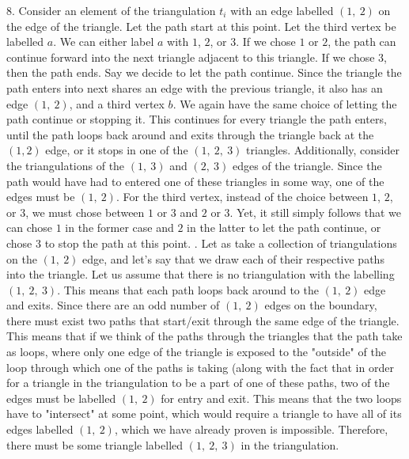 \documentclass{article}
\begin{document}
8. Consider an element of the triangulation $t_i$ with an edge labelled $(1, \ 2)$ on the edge of the triangle. Let the path start at this point. Let the third vertex be labelled $a$. We can either label $a$ with $1$, $2$, or $3$. If we chose $1$ or $2$, the path can continue forward into the next triangle adjacent to this triangle. If we chose $3$, then the path ends. Say we decide to let the path continue. Since the triangle the path enters into next shares an edge with the previous triangle, it also has an edge $(1, \ 2)$, and a third vertex $b$. We again have the same choice of letting the path continue or stopping it. This continues for every triangle the path enters, until the path loops back around and exits through the triangle back at the $(1, 2)$ edge, or it stops in one of the $(1, \ 2, \ 3)$ triangles. Additionally, consider the triangulations of the $(1, \ 3)$ and $(2, \ 3)$ edges of the triangle. Since the path would have had to entered one of these triangles in some way, one of the edges must be $(1, \ 2)$. For the third vertex, instead of the choice between $1$, $2$, or $3$, we must chose between $1$ or $3$ and $2$ or $3$. Yet, it still simply follows that we can chose $1$ in the former case and $2$ in the latter to let the path continue, or chose $3$ to stop the path at this point.
\newline{}. Let as take a collection of triangulations on the $(1, \ 2)$ edge, and let's say that we draw each of their respective paths into the triangle. Let us assume that there is no triangulation with the labelling $(1, \ 2, \ 3)$. This means that each path loops back around to the $(1, \ 2)$ edge and exits. Since there are an odd number of $(1, \ 2)$ edges on the boundary, there must exist two paths that start/exit through the same edge of the triangle. This means that if we think of the paths through the triangles that the path take as loops, where only one edge of the triangle is exposed to the "outside" of the loop through which one of the paths is taking (along with the fact that in order for a triangle in the triangulation to be a part of one of these paths, two of the edges must be labelled $(1, \ 2)$ for entry and exit. This means that the two loops have to "intersect" at some point, which would require a triangle to have all of its edges labelled $(1, \ 2)$, which we have already proven is impossible. Therefore, there must be some triangle labelled $(1, \ 2, \ 3)$ in the triangulation.
\newline\newline
\end{document}
